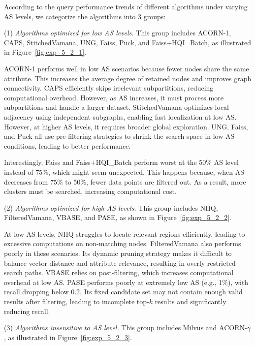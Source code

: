 \documentclass[sigconf, nonacm]{acmart}
\begin{document}
According to the query performance trends of different algorithms under varying AS levels, we categorize the algorithms into 3 groups:

\par
(1) \textit{Algorithms optimized for low AS levels.}  
This group includes ACORN-1, CAPS, StitchedVamana, UNG, Faiss, Puck, and Faiss+HQI\_Batch, as illustrated in Figure~\ref{fig:exp_5_2_1}.

ACORN-1 performs well in low AS scenarios because fewer nodes share the same attribute. This increases the average degree of retained nodes and improves graph connectivity. CAPS efficiently skips irrelevant subpartitions, reducing computational overhead. However, as AS increases, it must process more subpartitions and handle a larger dataset. StitchedVamana optimizes local adjacency using independent subgraphs, enabling fast localization at low AS. However, at higher AS levels, it requires broader global exploration. UNG, Faiss, and Puck all use pre-filtering strategies to shrink the search space in low AS conditions, leading to better performance.

Interestingly, Faiss and Faiss+HQI\_Batch perform worst at the 50\% AS level instead of 75\%, which might seem unexpected. This happens because, when AS decreases from 75\% to 50\%, fewer data points are filtered out. As a result, more clusters must be searched, increasing computational cost.

\par
(2) \textit{Algorithms optimized for high AS levels.}  
This group includes NHQ, FilteredVamana, VBASE, and PASE, as shown in Figure~\ref{fig:exp_5_2_2}.

At low AS levels, NHQ struggles to locate relevant regions efficiently, leading to excessive computations on non-matching nodes. FilteredVamana also performs poorly in these scenarios. Its dynamic pruning strategy makes it difficult to balance vector distance and attribute relevance, resulting in overly restricted search paths.
VBASE relies on post-filtering, which increases computational overhead at low AS. PASE performs poorly at extremely low AS (e.g., 1\%), with recall dropping below 0.2. Its fixed candidate set may not contain enough valid results after filtering, leading to incomplete top-$k$ results and significantly reducing recall.

\par
(3) \textit{Algorithms insensitive to AS level.}  
This group includes Milvus and ACORN-\(\gamma\), as illustrated in Figure~\ref{fig:exp_5_2_3}.
\end{document}
